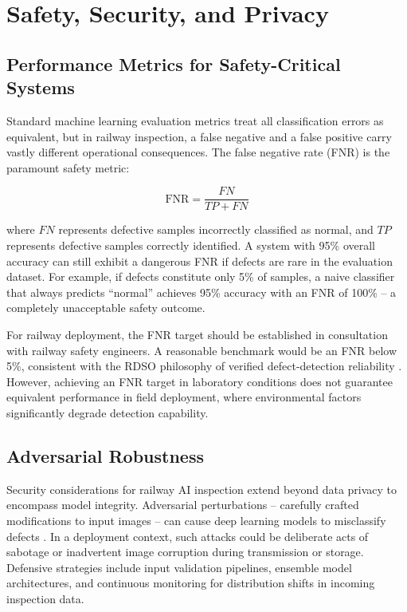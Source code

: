 \documentclass[conference]{IEEE}
\begin{document}
\section{Safety, Security, and Privacy}
\label{sec:safety}

\subsection{Performance Metrics for Safety-Critical Systems}

Standard machine learning evaluation metrics treat all classification errors as equivalent, but in railway inspection, a false negative and a false positive carry vastly different operational consequences. The false negative rate (FNR) is the paramount safety metric:

\begin{equation}
\text{FNR} = \frac{FN}{TP + FN}
\label{eq:fnr}
\end{equation}

where $FN$ represents defective samples incorrectly classified as normal, and $TP$ represents defective samples correctly identified. A system with 95\% overall accuracy can still exhibit a dangerous FNR if defects are rare in the evaluation dataset. For example, if defects constitute only 5\% of samples, a naive classifier that always predicts ``normal'' achieves 95\% accuracy with an FNR of 100\% -- a completely unacceptable safety outcome.

For railway deployment, the FNR target should be established in consultation with railway safety engineers. A reasonable benchmark would be an FNR below 5\%, consistent with the RDSO philosophy of verified defect-detection reliability \cite{rdso2020}. However, achieving an FNR target in laboratory conditions does not guarantee equivalent performance in field deployment, where environmental factors significantly degrade detection capability.

\subsection{Adversarial Robustness}

Security considerations for railway AI inspection extend beyond data privacy to encompass model integrity. Adversarial perturbations -- carefully crafted modifications to input images -- can cause deep learning models to misclassify defects \cite{ieee2025}. In a deployment context, such attacks could be deliberate acts of sabotage or inadvertent image corruption during transmission or storage. Defensive strategies include input validation pipelines, ensemble model architectures, and continuous monitoring for distribution shifts in incoming inspection data.
\end{document}

